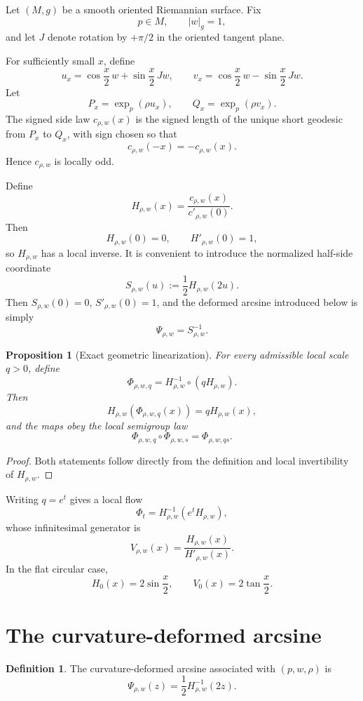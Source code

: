 \documentclass[11pt]{article}
\newtheorem{proposition}[theorem]{Proposition}
\theoremstyle{definition}
\newtheorem{definition}[theorem]{Definition}
\theoremstyle{remark}
\begin{document}
Let \((M,g)\) be a smooth oriented Riemannian surface.  Fix
\[
p\in M,\qquad |w|_g=1,
\]
and let \(J\) denote rotation by \(+\pi/2\) in the oriented tangent plane.

For sufficiently small \(x\), define
\[
u_x
=
\cos\frac{x}{2}\,w
+
\sin\frac{x}{2}\,Jw,
\qquad
v_x
=
\cos\frac{x}{2}\,w
-
\sin\frac{x}{2}\,Jw.
\]
Let
\[
P_x=\exp_p(\rho u_x),
\qquad
Q_x=\exp_p(\rho v_x).
\]
The signed side law \(c_{\rho,w}(x)\) is the signed length of the unique short
geodesic from \(P_x\) to \(Q_x\), with sign chosen so that
\[
c_{\rho,w}(-x)=-c_{\rho,w}(x).
\]
Hence \(c_{\rho,w}\) is locally odd.

Define
\[
H_{\rho,w}(x)
=
\frac{c_{\rho,w}(x)}{c'_{\rho,w}(0)}.
\]
Then
\[
H_{\rho,w}(0)=0,
\qquad
H'_{\rho,w}(0)=1,
\]
so \(H_{\rho,w}\) has a local inverse.  It is convenient to introduce
the normalized half-side coordinate
\[
\boxed{
S_{\rho,w}(u):=\frac12 H_{\rho,w}(2u).
}
\]
Then \(S_{\rho,w}(0)=0\), \(S'_{\rho,w}(0)=1\), and the
deformed arcsine introduced below is simply
\[
\Psi_{\rho,w}=S_{\rho,w}^{-1}.
\]

\begin{proposition}[Exact geometric linearization]
\label{prop:exact-linearization}
For every admissible local scale \(q>0\), define
\[
\Phi_{\rho,w,q}
=
H_{\rho,w}^{-1}\circ(qH_{\rho,w}).
\]
Then
\[
H_{\rho,w}\!\left(\Phi_{\rho,w,q}(x)\right)
=
qH_{\rho,w}(x),
\]
and the maps obey the local semigroup law
\[
\Phi_{\rho,w,q}\circ\Phi_{\rho,w,s}
=
\Phi_{\rho,w,qs}.
\]
\end{proposition}

\begin{proof}
Both statements follow directly from the definition and local invertibility
of \(H_{\rho,w}\).
\end{proof}

Writing \(q=e^t\) gives a local flow
\[
\Phi_t
=
H_{\rho,w}^{-1}(e^tH_{\rho,w}),
\]
whose infinitesimal generator is
\[
V_{\rho,w}(x)
=
\frac{H_{\rho,w}(x)}{H'_{\rho,w}(x)}.
\]
In the flat circular case,
\[
H_0(x)=2\sin\frac{x}{2},
\qquad
V_0(x)=2\tan\frac{x}{2}.
\]

\section{The curvature-deformed arcsine}
\label{sec:deformed-arcsine}

\begin{definition}
The curvature-deformed arcsine associated with \((p,w,\rho)\) is
\[
\boxed{
\Psi_{\rho,w}(z)
=
\frac12H_{\rho,w}^{-1}(2z).
}
\]
\end{definition}
\end{document}
